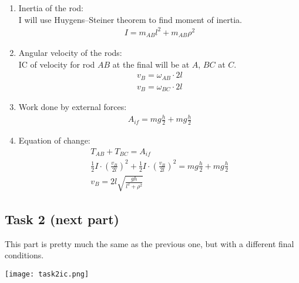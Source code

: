 \begin{enumerate}
\begin{enumerate}
              \item Inertia of the rod: \\
                    I will use Huygens–Steiner theorem to find moment of inertia. \\
                    \begin{align}
                        I = m_{AB}l^2 + m_{AB}\rho^2
                    \end{align}
              \item Angular velocity of the rods: \\
                    IC of velocity for rod $AB$ at the final will be at $A$, $BC$ at $C$. \\
                    \begin{align}
                        v_B = \omega_{AB} \cdot 2l \\
                        v_B = \omega_{BC} \cdot 2l
                    \end{align}
              \item Work done by external forces: \\
                    \begin{align}
                        A_{if} = mg \frac{h}{2} + mg \frac{h}{2}
                    \end{align}
              \item Equation of change:
                    \begin{align}
                        T_{AB} + T_{BC} = A_{if}                                                                                        \\
                        \frac{1}{2}I \cdot (\frac{v_B}{2l})^2 + \frac{1}{2}I \cdot (\frac{v_B}{2l})^2 = mg \frac{h}{2} + mg \frac{h}{2} \\
                        v_B = 2l \sqrt{\frac{gh}{l^2 + \rho^2}}
                    \end{align}
          \end{enumerate}
\end{enumerate}

\subsection*{Task 2 (next part)}

This part is pretty much the same as the previous one, but with a different final conditions.

\texttt{[image: task2ic.png]}

